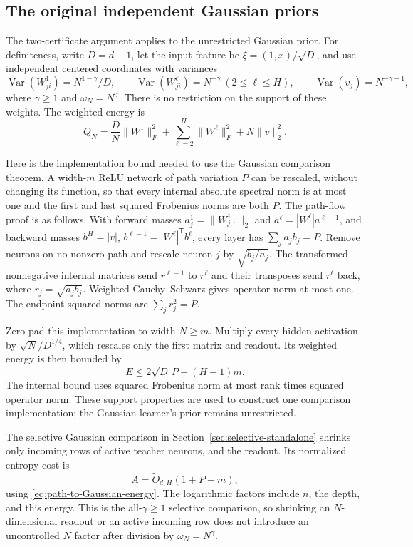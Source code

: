 \subsection{The original independent Gaussian priors}
The two-certificate argument applies to the unrestricted Gaussian prior. For definiteness, write $D=d+1$, let the input feature be $\xi=(1,x)/\sqrt D$, and use independent centered coordinates with variances
\begin{equation}
 \operatorname{Var}(W^1_{ji})=N^{1-\gamma}/D,
 \qquad \operatorname{Var}(W^\ell_{ji})=N^{-\gamma}\ (2\le\ell\le H),
 \qquad \operatorname{Var}(v_j)=N^{-\gamma-1},
 \label{eq:width-only-Gaussian-prior}
\end{equation}
where $\gamma\ge1$ and $\omega_N=N^\gamma$. There is no restriction on the support of these weights. The weighted energy is
\[
 Q_N=\frac DN\|W^1\|_F^2+\sum_{\ell=2}^H\|W^\ell\|_F^2+N\|v\|_2^2.
\]

Here is the implementation bound needed to use the Gaussian comparison theorem. A width-$m$ ReLU network of path variation $P$ can be rescaled, without changing its function, so that every internal absolute spectral norm is at most one and the first and last squared Frobenius norms are both $P$. The path-flow proof is as follows. With forward masses $a^1_j=\|W^1_{j,:}\|_2$ and $a^\ell=|W^\ell|a^{\ell-1}$, and backward masses $b^H=|v|$, $b^{\ell-1}=|W^\ell|^{\mathsf T}b^\ell$, every layer has $\sum_j a_jb_j=P$. Remove neurons on no nonzero path and rescale neuron $j$ by $\sqrt{b_j/a_j}$. The transformed nonnegative internal matrices send $r^{\ell-1}$ to $r^\ell$ and their transposes send $r^\ell$ back, where $r_j=\sqrt{a_jb_j}$. Weighted Cauchy--Schwarz gives operator norm at most one. The endpoint squared norms are $\sum_jr_j^2=P$.

Zero-pad this implementation to width $N\ge m$. Multiply every hidden activation by $\sqrt N/D^{1/4}$, which rescales only the first matrix and readout. Its weighted energy is then bounded by
\begin{equation}
 E\le2\sqrt D\,P+(H-1)m.
 \label{eq:path-to-Gaussian-energy}
\end{equation}
The internal bound uses squared Frobenius norm at most rank times squared operator norm. These support properties are used to construct one comparison implementation; the Gaussian learner's prior remains unrestricted.

The selective Gaussian comparison in Section~\ref{sec:selective-standalone} shrinks only incoming rows of active teacher neurons, and the readout. Its normalized entropy cost is
\begin{equation}
 A=\widetilde O_{d,H}(1+P+m),
 \label{eq:Gaussian-path-resource}
\end{equation}
using \eqref{eq:path-to-Gaussian-energy}. The logarithmic factors include $n$, the depth, and this energy. This is the all-$\gamma\ge1$ selective comparison, so shrinking an $N$-dimensional readout or an active incoming row does not introduce an uncontrolled $N$ factor after division by $\omega_N=N^\gamma$.

